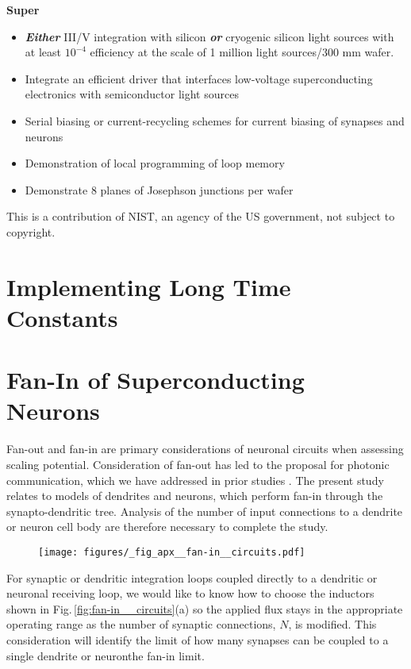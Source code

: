\documentclass[twocolumn]{article}
\begin{document}
\textbf{Super}
\begin{itemize}
    \item \textbf{\textit{Either} }III/V integration with silicon \textbf{\textit{or}} cryogenic silicon light sources with at least $10^{-4}$ efficiency at the scale of 1 million light sources/300 mm wafer.
    \item Integrate an efficient driver that interfaces low-voltage superconducting electronics with semiconductor light sources
    \item Serial biasing or current-recycling schemes for current biasing of synapses and neurons
    \item Demonstration of local programming of loop memory
    \item Demonstrate 8 planes of Josephson junctions per wafer
    
\end{itemize}


\vspace{0.5em}
This is a contribution of NIST, an agency of the US government, not subject to copyright.
	
\newpage
\appendix

\section{Implementing Long Time Constants}

\section{Fan-In of Superconducting Neurons}
Fan-out and fan-in are primary considerations of neuronal circuits when assessing scaling potential. Consideration of fan-out has led to the proposal for photonic communication, which we have addressed in prior studies \cite{shbu2017,chbu2017,chbu2018,sh2018_ICRC,sh2019,sh2020}. The present study relates to models of dendrites and neurons, which perform fan-in through the synapto-dendritic tree. Analysis of the number of input connections to a dendrite or neuron cell body are therefore necessary to complete the study.

\begin{figure}[h!]
\texttt{[image: figures/\_fig\_apx\_\_fan-in\_\_circuits.pdf]}
\end{figure}
For synaptic or dendritic integration loops coupled directly to a dendritic or neuronal receiving loop, we would like to know how to choose the inductors shown in Fig.\,\ref{fig:fan-in__circuits}(a) so the applied flux stays in the appropriate operating range as the number of synaptic connections, $N$, is modified. This consideration will identify the limit of how many synapses can be coupled to a single dendrite or neuron\textemdash the fan-in limit. 
\end{document}

